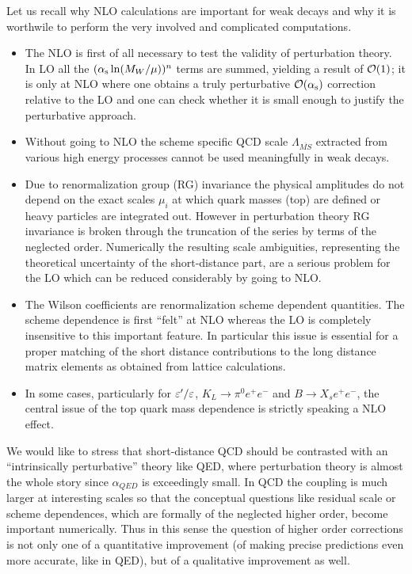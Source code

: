 Let us recall why NLO calculations are important for weak decays and why
it is worthwile to perform the very involved and complicated
computations.
\begin{itemize}
\item The NLO is first of all necessary to test the validity of
perturbation theory. In LO all the $(\alpha_{\rm s} \ln(M_W/\mu))^n$ terms
are summed, yielding a result of ${\cal O}(1)$; it is only at NLO
where one obtains a truly perturbative ${\cal O}(\alpha_{\rm s})$
correction relative to the LO and one can check whether it is small
enough to justify the perturbative approach.
\item Without going to NLO the scheme specific
QCD scale $\Lambda_{\overline{MS}}$
extracted from various high energy processes cannot be used
meaningfully in weak decays.
\item Due to renormalization group (RG) invariance
the physical amplitudes do not depend on the exact scales $\mu_i$
at which quark masses (top) are defined or heavy particles are
integrated out. However in perturbation theory RG invariance is broken
through the truncation of the series by terms of the neglected order.
Numerically the resulting scale ambiguities, representing the
theoretical uncertainty of the short-distance part, are a serious
problem for the LO which can be reduced considerably by going to NLO.
\item The Wilson coefficients are renormalization
scheme dependent quantities. The
scheme dependence is first ``felt'' at NLO whereas the LO is completely
insensitive to this important feature. In particular this issue is
essential for a proper matching of the short distance contributions to
the long distance matrix elements as obtained from lattice calculations.
\item In some cases, particularly for $\varepsilon'/\varepsilon$, $K_L\to\pi^0e^+e^-$ and
$B \to X_s e^+ e^-$, the central issue of the top quark mass dependence
is strictly speaking a NLO effect.
\end{itemize}
We would like to stress that short-distance QCD should be contrasted
with an ``intrinsically perturbative'' theory like QED, where
perturbation theory is almost the whole story since $\alpha_{QED}$ is
exceedingly small. In QCD the coupling is much larger at
interesting scales so that the conceptual questions like residual
scale or scheme dependences, which are formally of the neglected
higher order, become important numerically. Thus in this sense the
question of higher order corrections is not only one of a
quantitative improvement (of making precise predictions even more
accurate, like in QED), but of a qualitative improvement as well.

